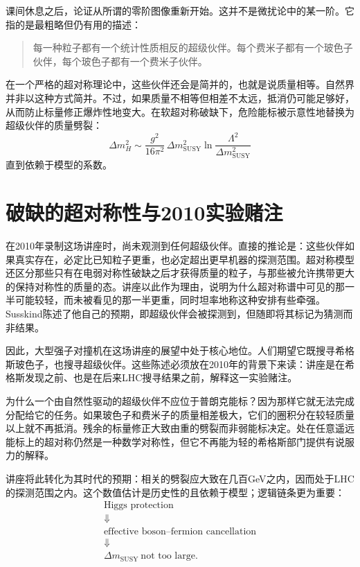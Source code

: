 课间休息之后，论证从所谓的零阶图像重新开始。这并不是微扰论中的某一阶。它指的是最粗略但仍有用的描述：
\begin{quote}
每一种粒子都有一个统计性质相反的超级伙伴。每个费米子都有一个玻色子伙伴，每个玻色子都有一个费米子伙伴。
\end{quote}
在一个严格的超对称理论中，这些伙伴还会是简并的，也就是说质量相等。自然界并非以这种方式简并。不过，如果质量不相等但相差不太远，抵消仍可能足够好，从而防止标量修正爆炸性地变大。在软超对称破缺下，危险能标被示意性地替换为超级伙伴的质量劈裂：
\begin{equation}
\Delta m_H^2\sim
\frac{g^2}{16\pi^2}\,\Delta m_{\mathrm{SUSY}}^2
\ln\!\frac{\Lambda^2}{\Delta m_{\mathrm{SUSY}}^2}
\end{equation}
直到依赖于模型的系数。

\section{破缺的超对称性与2010实验赌注}

在2010年录制这场讲座时，尚未观测到任何超级伙伴。直接的推论是：这些伙伴如果真实存在，必定比已知粒子更重，也必定超出更早机器的探测范围。超对称模型还区分那些只有在电弱对称性破缺之后才获得质量的粒子，与那些被允许携带更大的保持对称性的质量的态。讲座以此作为理由，说明为什么超对称谱中可见的那一半可能较轻，而未被看见的那一半更重，同时坦率地称这种安排有些牵强。Susskind陈述了他自己的预期，即超级伙伴会被探测到，但随即将其标记为猜测而非结果。

因此，大型强子对撞机在这场讲座的展望中处于核心地位。人们期望它既搜寻希格斯玻色子，也搜寻超级伙伴。这些陈述必须放在2010年的背景下来读：讲座是在希格斯发现之前、也是在后来LHC搜寻结果之前，解释这一实验赌注。

为什么一个由自然性驱动的超级伙伴不应位于普朗克能标？因为那样它就无法完成分配给它的任务。如果玻色子和费米子的质量相差极大，它们的圈积分在较轻质量以上就不再抵消。残余的标量修正大致由重的劈裂而非弱能标决定。处在任意遥远能标上的超对称仍然是一种数学对称性，但它不再能为轻的希格斯部门提供有说服力的解释。

讲座将此转化为其时代的预期：相关的劈裂应大致在几百GeV之内，因而处于LHC的探测范围之内。这个数值估计是历史性的且依赖于模型；逻辑链条更为重要：
\begin{equation}
\begin{gathered}
\text{Higgs protection}\\
\Downarrow\\
\text{effective boson--fermion cancellation}\\
\Downarrow\\
\Delta m_{\mathrm{SUSY}}\ \text{not too large}.
\end{gathered}
\end{equation}

